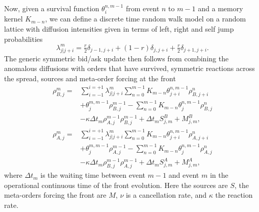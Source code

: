 \documentclass[5p,final]{elsarticle}
\begin{document}
Now, given a survival function $\theta^{n,m-1}_i$ from event $n$ to $m-1$ and a memory kernel $K_{m-n}$, we can define a discrete time random walk model on a random lattice with diffusion intensities given in terms of left, right and self jump probabilities \cite{angstmann2015dtrw,diana2024anomalous} 
\begin{equation}
    \lambda_{j|j+i}^{m} = \tfrac{r}{2} \delta_{j-1,j+i}+ (1-r) \delta_{j,j+i}+\tfrac{r}{2} \delta_{j+1,j+i}. \label{eq:TransitionProb1}
\end{equation}
The generic symmetric bid/ask update then follows from combining the anomalous diffusions with orders that have survived, symmetric reactions across the spread, sources and meta-order forcing at the front
\begin{align}
\rho_{B,j}^{m}
=&\sum_{i=-1}^{i=+1} \lambda_{j|j+i}^{m} \sum_{n=0}^{m-1} K_{m-n} \theta_{j+i}^{n,m-1} \rho_{B,j+i}^{n}
\nonumber\\
&+ \theta^{m,m-1}_{j} \rho_{B,j}^{m-1}
-\sum_{n=0}^{m-1} K_{m-n} \theta^{n,m-1}_{j} \rho_{B,j}^{n} \nonumber \\ 
&- \kappa\Delta t_m\rho_{A,j}^{m-1}\rho_{B,j}^{m-1}
+ \Delta t_m S_{j,m}^{B}+M_{j,m}^{B},
\label{eq:rapid_bid_full}
\\
\rho_{A,j}^{m}
=& \sum_{i=-1}^{i=+1} \lambda_{j|j+i}^{m} \sum_{n=0}^{m-1} K_{m-n} \theta_{j+i}^{n,m-1} \rho_{A,j+i}^{n}
\nonumber\\
&+\theta^{m,m-1}_{j} \rho_{A,j}^{m-1}
- \sum_{n=0}^{m-1} K_{m-n} \theta^{n,m-1}_{j} \rho_{A,j}^{n} \nonumber \\
&- \kappa\Delta t_m\rho_{B,j}^{m-1}\rho_{A,j}^{m-1}
+ \Delta t_m S_{j,m}^{A}+M_{j,m}^{A},
\label{eq:rapid_ask_full}
\end{align}
where $\Delta t_m$ is the waiting time between event $m-1$ and event $m$ in the operational continuous time of the front evolution. Here the sources are $S$, the meta-orders forcing the front are $M$, $\nu$ is a cancellation rate, and $\kappa$ the reaction rate.
\end{document}
